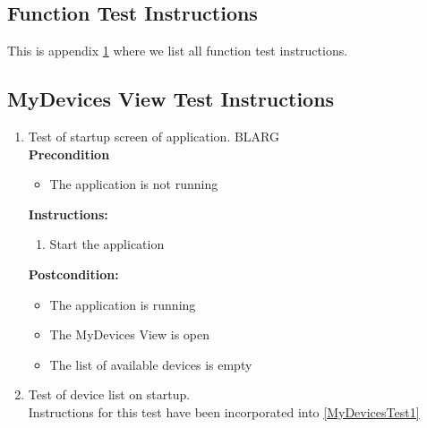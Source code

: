 \documentclass[a4paper]{article}
\newlength{\testlabellength}
\newenvironment{testlist}{\begin{enumerate}[label=\bfseries Instruction \thesubsection.\arabic* , labelindent=0pt, labelwidth=\testlabellength , leftmargin=2cm]}{\end{enumerate}}
\newenvironment{precondition}{
{\color{white}BLARG}\\ 
\textbf{Precondition}
\begin{itemize}[labelindent=0cm, labelwidth=2cm , leftmargin=1cm]
}
{\end{itemize}}
\newenvironment{instruction}{
\textbf{Instructions:}
\begin{enumerate}[label=\bfseries  \arabic*., labelindent=0cm, labelwidth=2cm , leftmargin=1cm]
}
{\end{enumerate}}
\newenvironment{postcondition}{
\textbf{Postcondition:}
\begin{itemize}[labelindent=0cm, labelwidth=2cm , leftmargin=1cm]
}
{\end{itemize}}
\begin{document}
\begin{appendices}

\section{Function Test Instructions} \label{appendix:section:functiontest}
This is appendix \ref{appendix:section:functiontest} where we list all function test instructions.


\subsection{MyDevices View Test Instructions}
\begin{testlist}

    \item Test of startup screen of application. \label{MyDevicesTest1}
    	\begin{precondition}
    		\item The application is not running
    	\end{precondition}
    	\begin{instruction}
			\item Start the application
    	\end{instruction}
    	\begin{postcondition}
    		\item The application is running
    		\item The MyDevices View is open
    		\item The list of available devices is empty
    	\end{postcondition}
    
    
	\item Test of device list on startup. \\
		Instructions for this test have been incorporated into \ref{MyDevicesTest1}
    


\end{testlist}
\end{appendices}
\end{document}
